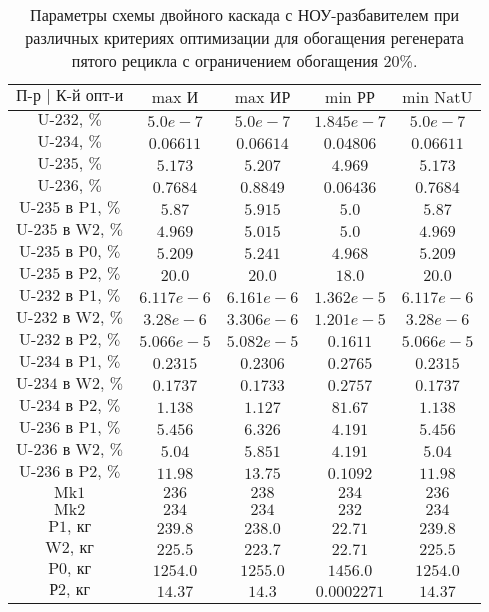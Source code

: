 \begin{table}
    \begin{tabular}{ccccc}
        $\text{П-р | К-й опт-и}$ & $\text{max И}$ & $\text{max ИР}$ & $\text{min РР}$ & $\text{min NatU}$\\ \hline
        $\text{U-232, \%}$ & $5.0e-7$ & $5.0e-7$ & $1.845e-7$ & $5.0e-7$\\ \hline
        $\text{U-234, \%}$ & $0.06611$ & $0.06614$ & $0.04806$ & $0.06611$\\ \hline
        $\text{U-235, \%}$ & $5.173$ & $5.207$ & $4.969$ & $5.173$\\ \hline
        $\text{U-236, \%}$ & $0.7684$ & $0.8849$ & $0.06436$ & $0.7684$\\ \hline
        $\text{U-235 в P1, \%}$ & $5.87$ & $5.915$ & $5.0$ & $5.87$\\ \hline
        $\text{U-235 в W2, \%}$ & $4.969$ & $5.015$ & $5.0$ & $4.969$\\ \hline
        $\text{U-235 в P0, \%}$ & $5.209$ & $5.241$ & $4.968$ & $5.209$\\ \hline
        $\text{U-235 в P2, \%}$ & $20.0$ & $20.0$ & $18.0$ & $20.0$\\ \hline
        $\text{U-232 в P1, \%}$ & $6.117e-6$ & $6.161e-6$ & $1.362e-5$ & $6.117e-6$\\ \hline
        $\text{U-232 в W2, \%}$ & $3.28e-6$ & $3.306e-6$ & $1.201e-5$ & $3.28e-6$\\ \hline
        $\text{U-232 в P2, \%}$ & $5.066e-5$ & $5.082e-5$ & $0.1611$ & $5.066e-5$\\ \hline
        $\text{U-234 в P1, \%}$ & $0.2315$ & $0.2306$ & $0.2765$ & $0.2315$\\ \hline
        $\text{U-234 в W2, \%}$ & $0.1737$ & $0.1733$ & $0.2757$ & $0.1737$\\ \hline
        $\text{U-234 в P2, \%}$ & $1.138$ & $1.127$ & $81.67$ & $1.138$\\ \hline
        $\text{U-236 в P1, \%}$ & $5.456$ & $6.326$ & $4.191$ & $5.456$\\ \hline
        $\text{U-236 в W2, \%}$ & $5.04$ & $5.851$ & $4.191$ & $5.04$\\ \hline
        $\text{U-236 в P2, \%}$ & $11.98$ & $13.75$ & $0.1092$ & $11.98$\\ \hline
        $\text{Mk1}$ & $236$ & $238$ & $234$ & $236$\\ \hline
        $\text{Mk2}$ & $234$ & $234$ & $232$ & $234$\\ \hline
        $\text{P1, кг}$ & $239.8$ & $238.0$ & $22.71$ & $239.8$\\ \hline
        $\text{W2, кг}$ & $225.5$ & $223.7$ & $22.71$ & $225.5$\\ \hline
        $\text{P0, кг}$ & $1254.0$ & $1255.0$ & $1456.0$ & $1254.0$\\ \hline
        $\text{Р2, кг}$ & $14.37$ & $14.3$ & $0.0002271$ & $14.37$
    \end{tabular}
\caption{Параметры схемы двойного каскада с НОУ-разбавителем при различных критериях оптимизации для обогащения регенерата пятого рецикла с ограничением обогащения 20\%.{\label{2opt5_20}}}
\end{table}





